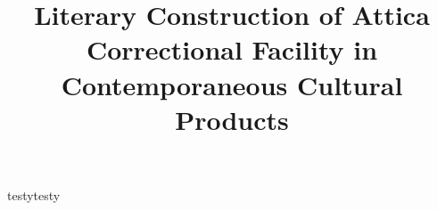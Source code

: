 \documentclass{article}
\title{ Literary Construction of Attica Correctional Facility in Contemporaneous Cultural Products }
\begin{document}
\maketitle

testytesty\autocite{letters-from-attica}

\nocite{*}


\end{document}
